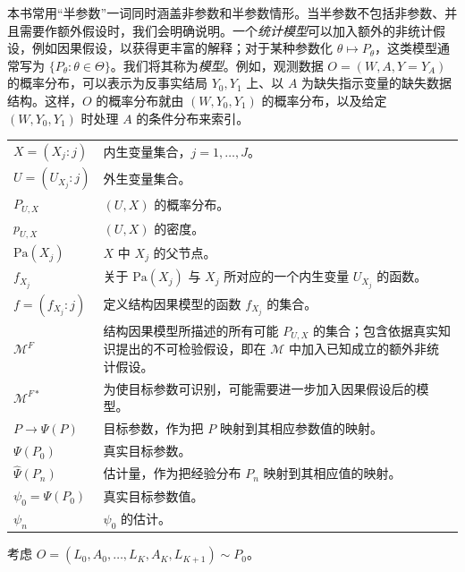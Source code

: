本书常用“半参数”一词同时涵盖非参数和半参数情形。当半参数不包括非参数、并且需要作额外假设时，我们会明确说明。一个\emph{统计模型}可以加入额外的非统计假设，例如因果假设，以获得更丰富的解释；对于某种参数化 $\theta\mapsto P_\theta$，这类模型通常写为 $\{P_\theta:\theta\in\Theta\}$。我们将其称为\emph{模型}。例如，观测数据 $O=(W,A,Y=Y_A)$ 的概率分布，可以表示为反事实结局 $Y_0,Y_1$ 上、以 $A$ 为缺失指示变量的缺失数据结构。这样，$O$ 的概率分布就由 $(W,Y_0,Y_1)$ 的概率分布，以及给定 $(W,Y_0,Y_1)$ 时处理 $A$ 的条件分布来索引。
\begin{longtable}{@{}p{}p{}@{}}
$X=(X_j:j)$ & 内生变量集合，$j=1,\ldots,J$。 \\
$U=(U_{X_j}:j)$ & 外生变量集合。 \\
$P_{U,X}$ & $(U,X)$ 的概率分布。 \\
$p_{U,X}$ & $(U,X)$ 的密度。 \\
$\mathrm{Pa}(X_j)$ & $X$ 中 $X_j$ 的父节点。 \\
$f_{X_j}$ & 关于 $\mathrm{Pa}(X_j)$ 与 $X_j$ 所对应的一个内生变量 $U_{X_j}$ 的函数。 \\
$f=(f_{X_j}:j)$ & 定义结构因果模型的函数 $f_{X_j}$ 的集合。 \\
$\mathcal M^F$ & 结构因果模型所描述的所有可能 $P_{U,X}$ 的集合；包含依据真实知识提出的不可检验假设，即在 $\mathcal M$ 中加入已知成立的额外非统计假设。 \\
$\mathcal M^{F*}$ & 为使目标参数可识别，可能需要进一步加入因果假设后的模型。 \\
$P\to\Psi(P)$ & 目标参数，作为把 $P$ 映射到其相应参数值的映射。 \\
$\Psi(P_0)$ & 真实目标参数。 \\
$\widehat\Psi(P_n)$ & 估计量，作为把经验分布 $P_n$ 映射到其相应值的映射。 \\
$\psi_0=\Psi(P_0)$ & 真实目标参数值。 \\
$\psi_n$ & $\psi_0$ 的估计。 \\
\end{longtable}
考虑 $O=(L_0,A_0,\ldots,L_K,A_K,L_{K+1})\sim P_0$。
